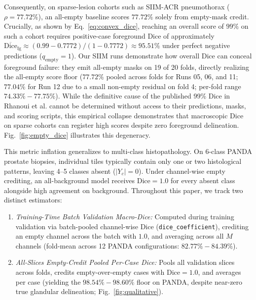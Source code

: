 \documentclass[preprint,12pt]{elsarticle}
\begin{document}
Consequently, on sparse-lesion cohorts such as SIIM-ACR pneumothorax ($\rho = 77.72\%$), an all-empty baseline scores $77.72\%$ solely from empty-mask credit. Crucially, as shown by Eq.~\ref{eq:convex_dice}, reaching an overall score of $99\%$ on such a cohort requires positive-case foreground Dice of approximately $\overline{\text{Dice}}_{\text{fg}} \approx (0.99 - 0.7772)/(1 - 0.7772) \approx 95.51\%$ under perfect negative predictions ($q_{\text{empty}}=1$). Our SIIM runs demonstrate how overall Dice can conceal foreground failure: they emit all-empty masks on 19 of 20 folds, directly realizing the all-empty score floor ($77.72\%$ pooled across folds for Runs 05, 06, and 11; $77.04\%$ for Run 12 due to a small non-empty residual on fold 4; per-fold range $74.33\%-77.75\%$). While the definitive cause of the published 99\% Dice in Rhanoui et al. cannot be determined without access to their predictions, masks, and scoring scripts, this empirical collapse demonstrates that macroscopic Dice on sparse cohorts can register high scores despite zero foreground delineation. Fig.~\ref{fig:empty_dice} illustrates this degeneracy.

This metric inflation generalizes to multi-class histopathology. On 6-class PANDA prostate biopsies, individual tiles typically contain only one or two histological patterns, leaving 4--5 classes absent ($|Y_c|=0$). Under channel-wise empty crediting, an all-background model receives $\text{Dice}=1.0$ for every absent class alongside high agreement on background. Throughout this paper, we track two distinct estimators:
\begin{enumerate}
    \item \emph{Training-Time Batch Validation Macro-Dice:} Computed during training validation via batch-pooled channel-wise Dice (\texttt{dice\_coefficient}), crediting an empty channel across the batch with $1.0$, and averaging across all $M$ channels (fold-mean across 12 PANDA configurations: $82.77\%-84.39\%$).
    \item \emph{All-Slices Empty-Credit Pooled Per-Case Dice:} Pools all validation slices across folds, credits empty-over-empty cases with $\text{Dice}=1.0$, and averages per case (yielding the $98.54\%-98.60\%$ floor on PANDA, despite near-zero true glandular delineation; Fig.~\ref{fig:qualitative}).
\end{enumerate}
\end{document}
